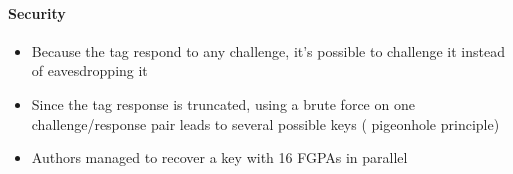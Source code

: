 \paragraph{Security}
\begin{itemize}
	\item Because the tag respond to any challenge, it's possible to challenge it instead
	of eavesdropping it
	\item Since the tag response is truncated, using a brute force on one 
	challenge/response pair leads to several possible keys ( pigeonhole principle)
	\item Authors managed to recover a key with 16 FGPAs in parallel
\end{itemize}
